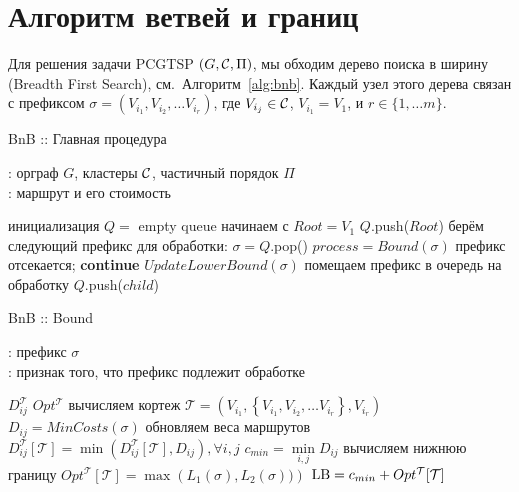 \section{Алгоритм ветвей и границ}\label{sec:SA}

Для решения задачи PCGTSP 
$(G,\mathcal{C},\Pi)$,
мы обходим дерево поиска в ширину
(Breadth First Search),
см.~Алгоритм~\ref{alg:bnb}.
Каждый узел этого дерева связан с префиксом
$\sigma = \left(V_{i_1}, V_{i_2}, \dots V_{i_r} \right)$,
где
$V_{i_j} \in \mathcal{C}$,
$V_{i_1} = V_1$,
и
$r \in \{{1, \dots m}\}$.

\begin{algorithm}
\caption{BnB :: Главная процедура}\label{alg:bnb}
\hspace*{\algorithmicindent}{\bf Вход}: орграф $G$, кластеры $\mathcal{C}$, частичный порядок $\Pi$ \\
\hspace*{\algorithmicindent}{\bf Выход}: маршрут и его стоимость
\begin{algorithmic}[1]
    \STATE инициализация $Q =$ empty queue
    \STATE начинаем с $Root = V_1$
    \STATE $Q$.push($Root$)
        \STATE берём следующий префикс для обработки: $\sigma = Q$.pop()
        \STATE $process = Bound(\sigma)$
            \STATE префикс отсекается; {\bf continue}
        \ENDIF
        \STATE $UpdateLowerBound(\sigma)$
            \STATE помещаем префикс в очередь на обработку $Q$.push($child$)
        \ENDFOR
    \ENDWHILE
\end{algorithmic}
\end{algorithm}

\begin{algorithm}
\caption{BnB :: Bound}\label{alg:bnb:bound}
\hspace*{\algorithmicindent}{\bf Вход}: префикс $\sigma$ \\
\hspace*{\algorithmicindent}{\bf Выход}: признак того, что префикс подлежит обработке
\begin{algorithmic}[1]
     $D_{ij}^{\mathcal T}$
     $Opt^{\mathcal T}$
    \STATE вычисляем кортеж $\mathcal T = \left(V_{i_1},
        \left\{V_{i_1}, V_{i_2}, \dots V_{i_r}\right\}, V_{i_r} \right)$
        \label{alg:bnb:bound:key}
    \STATE $D_{ij} = MinCosts(\sigma)$
        \label{alg:bnb:bound:pfx}
        \RETURN \FALSE
    \ENDIF
    \STATE  обновляем веса маршрутов $D_{ij}^{\mathcal T}[\mathcal T]  = \min \left(
        D_{ij}^{\mathcal T}[\mathcal T], D_{ij} \right),
        \forall i, j$
    \STATE  $c_{min} = \min\limits_{i, j} D_{ij}$
        \STATE вычисляем нижнюю границу $Opt^{\mathcal T}[\mathcal T] = \max\left(L_1(\sigma), L_2(\sigma))\right)$
        \label{alg:bnb:bound:sfx}
    \ENDIF
    \STATE $\mathrm{LB} = c_{min} + Opt^{\mathcal T}[\mathcal T]$
        \label{alg:bnb:bound:lb}
    \IF{$\LB > \UB$}
        \RETURN \FALSE
    \ENDIF
    \RETURN \TRUE
\end{algorithmic}
\end{algorithm}

